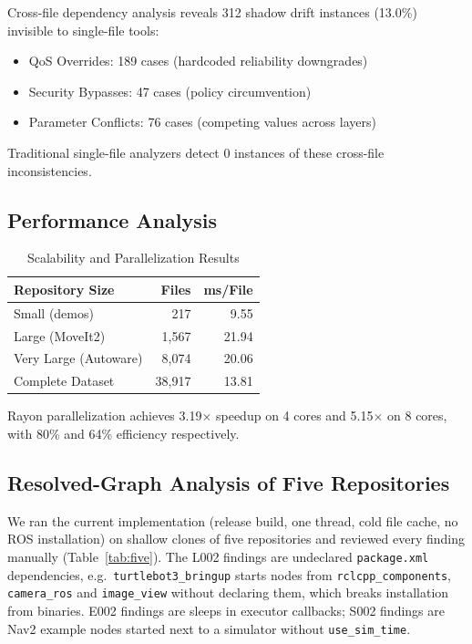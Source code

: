 \documentclass[conference]{IEEEtran}
\newcommand{\code}[1]{\texttt{#1}}
\begin{document}
Cross-file dependency analysis reveals 312 shadow drift instances (13.0\%) invisible to
single-file tools:
\begin{itemize}
\item QoS Overrides: 189 cases (hardcoded reliability downgrades)
\item Security Bypasses: 47 cases (policy circumvention)
\item Parameter Conflicts: 76 cases (competing values across layers)
\end{itemize}
Traditional single-file analyzers detect 0 instances of these cross-file inconsistencies.

\subsection{Performance Analysis}

\begin{table}[t]
\centering
\caption{Scalability and Parallelization Results}
\label{tab:scal}
\footnotesize
\begin{tabular}{@{}lrr@{}}
\toprule
Repository Size & Files & ms/File\\
\midrule
Small (demos) & 217 & 9.55\\
Large (MoveIt2) & 1,567 & 21.94\\
Very Large (Autoware) & 8,074 & 20.06\\
Complete Dataset & 38,917 & 13.81\\
\bottomrule
\end{tabular}
\end{table}

Rayon parallelization achieves 3.19$\times$ speedup on 4 cores and 5.15$\times$ on 8 cores, with
80\% and 64\% efficiency respectively.


\subsection{Resolved-Graph Analysis of Five Repositories}
\label{sec:five}

We ran the current implementation (release build, one thread, cold file cache, no ROS
installation) on shallow clones of five repositories and reviewed every finding manually
(Table~\ref{tab:five}). The L002 findings are undeclared \code{package.xml} dependencies, e.g.\
\code{turtlebot3\_bringup} starts nodes from \code{rclcpp\_components}, \code{camera\_ros} and
\code{image\_view} without declaring them, which breaks installation from binaries. E002 findings
are sleeps in executor callbacks; S002 findings are Nav2 example nodes started next to a simulator
without \code{use\_sim\_time}.
\end{document}
